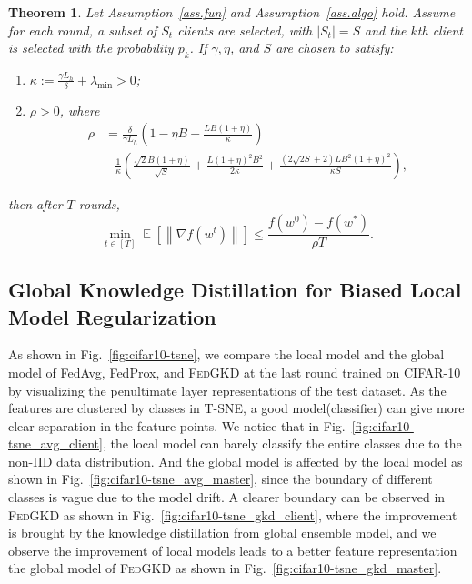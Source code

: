 \documentclass{article} %
\DeclareMathOperator{\E}{\mathbb{E}}
\newcommand{\norm}[1]{\left\|{#1}\right\|}
\newtheorem{theorem}{Theorem}
\newcommand{\system}{\textsc{FedGKD}\xspace}
\begin{document}
\begin{theorem}\label{thm:convergence}
Let Assumption~\ref{ass.fun} and Assumption~\ref{ass.algo} hold.  Assume for each round, a subset of $S_t$ clients are selected, with $|S_t|=S$ and the $k$th client is selected with the probability $p_k$. If $\gamma, \eta$, and $S$ are chosen to satisfy:
\begin{enumerate}
    \item $\kappa := \frac{\gamma L_h}{\delta} + \lambda_{\min}>0$;
    \item $\rho>0$, where
    \begin{align*}
         \rho & = \frac{\delta}{\gamma L_h}\left(1-\eta B-\frac{LB(1+\eta)}{\kappa}\right) \\
         & - \frac{1}{\kappa}\left(\frac{\sqrt{2}B(1+\eta)}{\sqrt{S}} + \frac{L(1+\eta)^2B^2}{2\kappa} \right.
         + \left. \frac{(2\sqrt{2S}+2)LB^2(1+\eta)^2}{\kappa S}\right),
    \end{align*}


\end{enumerate}
then after $T$ rounds,
$$
\min_{t\in[T]}\E[\norm{\nabla f(w^t)}] \leq \frac{f(w^0)-f(w^*)}{\rho T}.
$$
\end{theorem}

\subsection{Global Knowledge Distillation for Biased Local Model Regularization}
As shown in Fig.~\ref{fig:cifar10-tsne}, we compare the local model and the global model of FedAvg, FedProx, and \system at the last round trained on CIFAR-10 by visualizing the penultimate layer representations of the test dataset. As the features are clustered by classes in T-SNE, a good model(classifier) can give more clear separation in the feature points. We notice that in Fig.~\ref{fig:cifar10-tsne_avg_client}, the local model can barely classify the entire classes due to the non-IID data distribution. And the global model is affected by the local model as shown in Fig.~\ref{fig:cifar10-tsne_avg_master}, since the boundary of different classes is vague due to the model drift. A clearer boundary can be observed in \system as shown in  Fig.~\ref{fig:cifar10-tsne_gkd_client}, where the improvement is brought by the knowledge distillation from global ensemble model, and we observe the improvement of local models leads to a better feature representation the global model of \system as shown in Fig.~\ref{fig:cifar10-tsne_gkd_master}.
\end{document}
